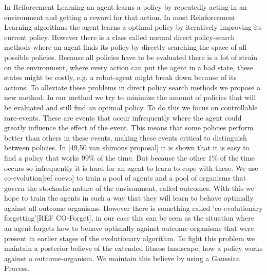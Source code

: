 In Reiforcement Learning an agent learns a policy by repeatedly acting in an environment and getting a reward for that action. In most Reinforcement Learning algorithms the agent learns a optimal policy by iteratively improving its current policy. However there is a class called normal direct policy-search methods where an agent finds its policy by directly searching the space of all possible policies. Because all policies have to be evaluated there is a lot of strain on the environment, where every action can put the agent in a bad state, these states might be costly, e.g. a robot-agent might break down because of its actions. To alleviate these problems in direct policy search methods we propose a new method. In our method we try to minimize the amount of policies that will be evaluated and still find an optimal policy. To do this we focus on controllable rare-events. These are events that occur infrequently where the agent could greatly influence the effect of the event. This means that some policies perform better than others in these events, making these events critical to distinguish between policies. In [49,50 van shimons proposal] it is shown that it is easy to find a policy that works $99\%$ of the time. But because the other $1\%$ of the time occurs so infrequently it is hard for an agent to learn to cope with these. 
We use co-evolution[ref coevo] to train a pool of agents and a pool of organisms that govern the stochastic nature of the environment, called outcomes. With this we hope to train the agents in such a way that they will learn to behave optimally against all outcome-organisms. However there is something called 'co-evolutionary forgetting'[REF CO-Forget], in our case this can be seen as the situation where an agent forgets how to behave optimally against outcome-organisms that were present in earlier stages of the evolutionary algorithm. To fight this problem we maintain a posterior believe of the extended fitness landscape, how a policy works against a outcome-organism. We maintain this believe by using a Gaussian Process.